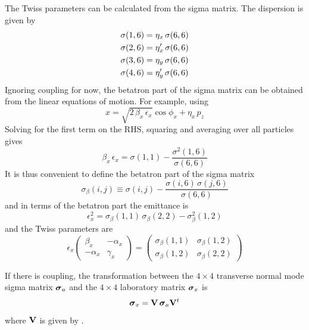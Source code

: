 The Twiss parameters can be calculated from the sigma matrix. The dispersion is given by
\begin{align}
  \sigma(1,6) &= \eta_x \, \sigma(6,6) \nonumber \\
  \sigma(2,6) &= \eta'_x \, \sigma(6,6) \\
  \sigma(3,6) &= \eta_y \, \sigma(6,6) \nonumber \\
  \sigma(4,6) &= \eta'_y \, \sigma(6,6) \nonumber
\end{align}
Ignoring coupling for now, the betatron part of the sigma matrix can be
obtained from the linear equations of motion. For example, using
\begin{equation}
  x = \sqrt{2 \, \beta_x \, \epsilon_x} \cos \phi_x + \eta_x \, p_z
\end{equation}
Solving for the first term on the RHS, squaring and averaging over all particles gives
\begin{equation}
  \beta_x \, \epsilon_x = \sigma(1,1) - \frac{\sigma^2(1,6)}{\sigma(6,6)}
\end{equation}
It is thus convenient to define the betatron part of the sigma matrix
\begin{equation}
  \sigma_\beta(i,j) \equiv \sigma(i,j) - \frac{\sigma(i,6) \, \sigma(j,6)}{\sigma(6,6)}
\end{equation}
and in terms of the betatron part the emittance is
\begin{equation}
  \epsilon_x^2 = \sigma_\beta(1,1) \, \sigma_\beta(2,2) - \sigma_\beta^2(1,2)
\end{equation}
and the Twiss parameters are
\begin{equation}
  \epsilon_x 
  \begin{pmatrix}
    \beta_x   & -\alpha_x \\
    -\alpha_x & \gamma_x
  \end{pmatrix} = 
  \begin{pmatrix}
    \sigma_\beta(1,1) & \sigma_\beta(1,2) \\
    \sigma_\beta(1,2) & \sigma_\beta(2,2) 
  \end{pmatrix}
\end{equation}

If there is coupling, the transformation between the $4\times 4$
transverse normal mode sigma matrix ${\boldsymbol{\sigma}}_a$ and the $4\times 4$
laboratory matrix ${\boldsymbol{\sigma}}_x$ is
\begin{equation}
  {\boldsymbol{\sigma}}_x = {\bf V} \, {\boldsymbol{\sigma}}_a {\bf V}^t
\end{equation}
where ${\bf V}$ is given by .


